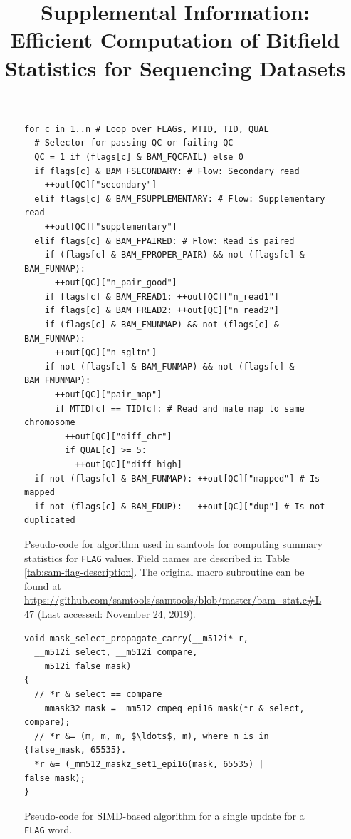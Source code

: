 \renewcommand{\figurename}{Supplementary Figure}
\renewcommand{\tablename}{Supplementary Table}
\setcounter{figure}{0}
\setcounter{table}{0}

\title{Supplemental Information: Efficient Computation of Bitfield Statistics for Sequencing Datasets}
\maketitlesup

\begin{figure}[h]
\captionsetup{type=figure}
\begin{verbatim}
for c in 1..n # Loop over FLAGs, MTID, TID, QUAL
  # Selector for passing QC or failing QC
  QC = 1 if (flags[c] & BAM_FQCFAIL) else 0
  if flags[c] & BAM_FSECONDARY: # Flow: Secondary read
    ++out[QC]["secondary"]
  elif flags[c] & BAM_FSUPPLEMENTARY: # Flow: Supplementary read
    ++out[QC]["supplementary"]
  elif flags[c] & BAM_FPAIRED: # Flow: Read is paired
    if (flags[c] & BAM_FPROPER_PAIR) && not (flags[c] & BAM_FUNMAP):
      ++out[QC]["n_pair_good"]
    if flags[c] & BAM_FREAD1: ++out[QC]["n_read1"]
    if flags[c] & BAM_FREAD2: ++out[QC]["n_read2"]
    if (flags[c] & BAM_FMUNMAP) && not (flags[c] & BAM_FUNMAP):
      ++out[QC]["n_sgltn"]
    if not (flags[c] & BAM_FUNMAP) && not (flags[c] & BAM_FMUNMAP):
      ++out[QC]["pair_map"]
      if MTID[c] == TID[c]: # Read and mate map to same chromosome
        ++out[QC]["diff_chr"]
        if QUAL[c] >= 5:
          ++out[QC]["diff_high]
  if not (flags[c] & BAM_FUNMAP): ++out[QC]["mapped"] # Is mapped
  if not (flags[c] & BAM_FDUP):   ++out[QC]["dup"] # Is not duplicated
\end{verbatim}
\caption{\label{fig:samtools-flagstats}Pseudo-code for algorithm used
in samtools for computing summary statistics for \texttt{FLAG} values. Field names are
described in Table \ref{tab:sam-flag-description}. The original macro subroutine can
be found at
\url{https://github.com/samtools/samtools/blob/master/bam_stat.c\#L47}
(Last accessed: November 24, 2019). 
}
\end{figure}

\begin{figure}[h]
\begin{verbatim}
void mask_select_propagate_carry(__m512i* r, 
  __m512i select, __m512i compare,
  __m512i false_mask) 
{
  // *r & select == compare
  __mmask32 mask = _mm512_cmpeq_epi16_mask(*r & select, compare);
  // *r &= (m, m, m, $\ldots$, m), where m is in {false_mask, 65535}.
  *r &= (_mm512_maskz_set1_epi16(mask, 65535) | false_mask);
}
\end{verbatim}
\caption{\label{fig:mask-select-propagate-carry}Pseudo-code for SIMD-based
algorithm for a single update for a \texttt{FLAG} word.}
\end{figure}

